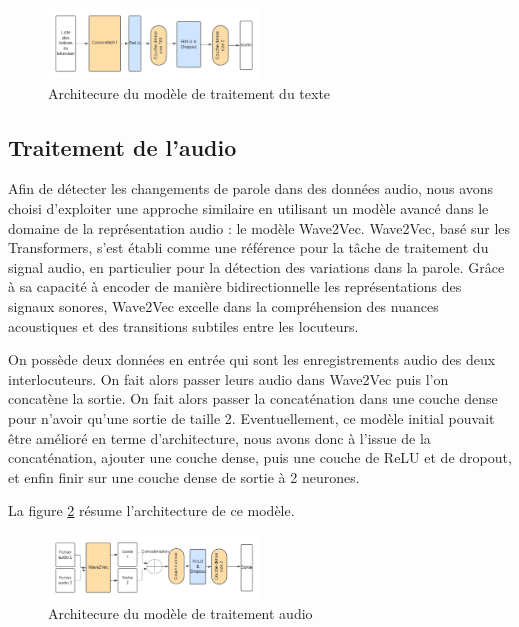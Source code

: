 \documentclass[a4paper]{article}
\begin{document}
\begin{figure}[H]
    \centering
    \includegraphics[width=0.5\textwidth]{Traitement_texte_SAM.png}
    \caption{Architecure du modèle de traitement du texte}
    \label{fig: model_text}
\end{figure}

\subsection{Traitement de l'audio}

\cite{DBLP:journals/corr/abs-2006-11477}
Afin de détecter les changements de parole dans des données audio, nous avons choisi d'exploiter une approche similaire en utilisant un modèle avancé dans le domaine de la représentation audio : le modèle Wave2Vec. Wave2Vec, basé sur les Transformers, s'est établi comme une référence pour la tâche de traitement du signal audio, en particulier pour la détection des variations dans la parole. Grâce à sa capacité à encoder de manière bidirectionnelle les représentations des signaux sonores, Wave2Vec excelle dans la compréhension des nuances acoustiques et des transitions subtiles entre les locuteurs. 

On possède deux données en entrée qui sont les enregistrements audio des deux interlocuteurs. On fait alors passer leurs audio dans Wave2Vec puis l'on concatène la sortie. On fait alors passer la concaténation dans une couche dense pour n'avoir qu'une sortie de taille 2.
Eventuellement, ce modèle initial pouvait être amélioré en terme d'architecture, nous avons donc à l'issue de la concaténation, ajouter une couche dense, puis une couche de ReLU et de dropout, et enfin finir sur une couche dense de sortie à 2 neurones. 

La figure \ref{fig: model_audio} résume l'architecture de ce modèle.

\begin{figure}[H]
    \centering
    \includegraphics[width=0.5\textwidth]{Traitement_audio_SAM.png}
    \caption{Architecure du modèle de traitement audio}
    \label{fig: model_audio}
\end{figure}
\end{document}
